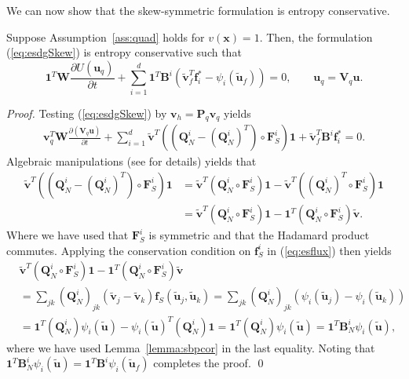 \documentclass{svjour3}                     %
\renewcommand{\tilde}{\widetilde}
\newcommand{\pd}[2]{\frac{\partial#1}{\partial#2}}
\newcommand{\LRp}[1]{\left( #1 \right)}
\begin{document}
We can now show that the skew-symmetric formulation is entropy conservative.  
\begin{theorem}
Suppose Assumption~\ref{ass:quad} holds for $v(\bm{x}) = 1$.  
Then, the formulation (\ref{eq:esdgSkew}) is entropy conservative such that
\begin{equation}
\bm{1}^T\bm{W}\pd{U(\bm{u}_q)}{t} + \sum_{i=1}^d\bm{1}^T\bm{B}^i \LRp{\tilde{\bm{v}}_f^T\bm{f}_i^* - \psi_i(\tilde{\bm{u}}_f)} = 0, \qquad \bm{u}_q = \bm{V}_q\bm{u}.
\label{eq:esdgthm}
\end{equation}
\label{thm:esdg}
\end{theorem}
\begin{proof}
Testing (\ref{eq:esdgSkew}) by $\bm{v}_h = \bm{P}_q\bm{v}_q$ yields 
\begin{align}
\bm{v}_q^T\bm{W}\pd{\LRp{\bm{V}_q\bm{u}}}{t} + \sum_{i=1}^d
\tilde{\bm{v}}^T \LRp{\LRp{\bm{Q}^i_N - \LRp{\bm{Q}^i_N}^T} \circ \bm{F}^i_S}\bm{1} + \tilde{\bm{v}}_f^T \bm{B}^i\bm{f}_i^* = 0.
\label{eq:entropyrhs}
\end{align}
Algebraic manipulations (see \cite{chan2017discretely} for details) yields that 
\begin{align*}
\tilde{\bm{v}}^T \LRp{\LRp{\bm{Q}^i_N - \LRp{\bm{Q}^i_N}^T} \circ \bm{F}^i_S}\bm{1} &= \tilde{\bm{v}}^T \LRp{\bm{Q}^i_N \circ \bm{F}^i_S}\bm{1} - \tilde{\bm{v}}^T \LRp{\LRp{\bm{Q}^i_N}^T \circ \bm{F}^i_S}\bm{1}\\
&= \tilde{\bm{v}}^T \LRp{\bm{Q}^i_N \circ \bm{F}^i_S}\bm{1} - \bm{1}^T \LRp{{\bm{Q}^i_N} \circ \bm{F}^i_S}\tilde{\bm{v}}.
\end{align*}
Where we have used that $\bm{F}^i_S$ is symmetric and that the Hadamard product commutes.  Applying the conservation condition on $\bm{f}^i_S$ in (\ref{eq:esflux}) then yields
\begin{align*}
&\tilde{\bm{v}}^T \LRp{\bm{Q}^i_N \circ \bm{F}^i_S}\bm{1} - \bm{1}^T \LRp{{\bm{Q}^i_N} \circ \bm{F}^i_S}\tilde{\bm{v}} \\
&= \sum_{jk} \LRp{\bm{Q}^i_N}_{jk} \LRp{\tilde{\bm{v}}_j-\tilde{\bm{v}}_k} \bm{f}_S\LRp{\tilde{\bm{u}}_j,\tilde{\bm{u}}_k} = \sum_{jk} \LRp{\bm{Q}^i_N}_{jk} \LRp{\psi_i(\tilde{\bm{u}}_j) - \psi_i(\tilde{\bm{u}}_k)}\\
&= \bm{1}^T\LRp{\bm{Q}^i_N}\psi_i(\tilde{\bm{u}}) - \psi_i(\tilde{\bm{u}})^T\LRp{\bm{Q}^i_N}\bm{1} = \bm{1}^T\LRp{\bm{Q}^i_N}\psi_i(\tilde{\bm{u}}) = \bm{1}^T\bm{B}^i_N\psi_i(\tilde{\bm{u}}),
\end{align*}
where we have used Lemma~\ref{lemma:sbpcor} in the last equality.  Noting that $\bm{1}^T\bm{B}^i_N\psi_i(\tilde{\bm{u}}) = \bm{1}^T\bm{B}^i \psi_i(\tilde{\bm{u}}_f)$ completes the proof.
\qed\end{proof}
\end{document}
